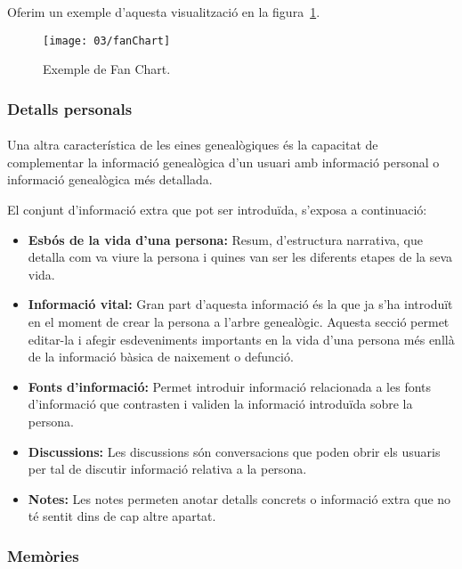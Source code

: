     Oferim un exemple d’aquesta visualització en la figura~\ref{fig:fanChart}.

    \begin{figure}[h]
        \texttt{[image: 03/fanChart]}
        \centering
        \caption{Exemple de Fan Chart.\label{fig:fanChart}}
    \end{figure}


    \subsubsection{Detalls personals}

    \paragraph{}
    Una altra característica de les eines genealògiques és la capacitat de complementar la informació ge\-nea\-lò\-gi\-ca d'un usuari amb informació personal o informació ge\-nea\-lò\-gi\-ca més detallada.

    El conjunt d'informació extra que pot ser introduïda, s'exposa a continuació:

    \begin{itemize}
        \item \textbf{Esbós de la vida d'una persona:} Resum, d’estructura narrativa, que detalla com va viure la persona i quines van ser les diferents etapes de la seva vida.
        \item \textbf{Informació vital:} Gran part d’aquesta informació és la que ja s’ha introduït en el moment de crear la persona a l’arbre genealògic. Aquesta secció permet editar-la i afegir esdeveniments importants en la vida d’una persona més enllà de la informació bàsica de naixement o defunció.
        \item \textbf{Fonts d’informació:} Permet introduir informació relacionada a les fonts d’informació que contrasten i validen la informació introduïda sobre la persona.
        \item \textbf{Discussions:} Les discussions són conversacions que poden obrir els usuaris per tal de discutir informació relativa a la persona.
        \item \textbf{Notes:} Les notes permeten anotar detalls concrets o informació extra que no té sentit dins de cap altre apartat.
    \end{itemize}


    \subsubsection{Memòries}

